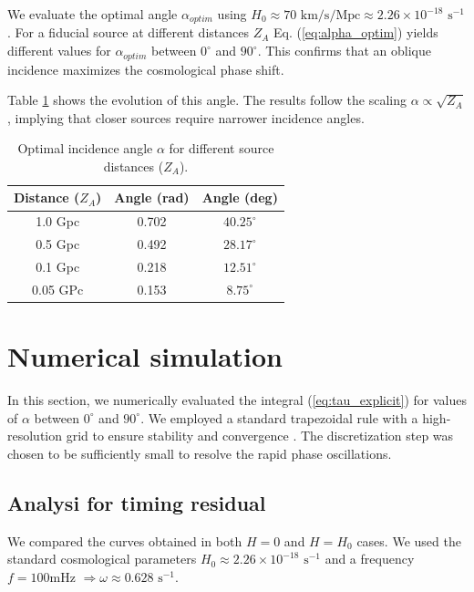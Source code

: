 \documentclass[twocolumn]{revtex4-2}
\begin{document}
We evaluate the optimal angle $\alpha_{optim}$ using $H_0 \approx 70 \text{ km/s/Mpc} \approx 2.26 \times 10^{-18} \text{ s}^{-1}$. For a fiducial source at different distances $Z_A$ Eq. (\ref{eq:alpha_optim}) yields different values for $\alpha_{optim}$ between $0^\circ$ and $90^\circ$. This confirms that an oblique incidence maximizes the cosmological phase shift.

Table \ref{tab:optimal_angles} shows the evolution of this angle. The results follow the scaling $\alpha \propto \sqrt{Z_A}$, implying that closer sources require narrower incidence angles.
\begin{table}[!ht]
\centering
\small 
\begin{tabular}{c c c} 
 \hline \hline
 \textbf{Distance} ($Z_A$) & \textbf{Angle} (rad) & \textbf{Angle} (deg) \\ 
 \hline
 1.0 Gpc & 0.702 & $40.25^\circ$ \\ 
 0.5 Gpc & 0.492 & $28.17^\circ$ \\
 0.1 Gpc & 0.218 & $12.51^\circ$ \\
 0.05 GPc & 0.153 & $8.75^\circ$ \\
 \hline \hline
\end{tabular}
\caption{Optimal incidence angle $\alpha$ for different source distances ($Z_A$).}
\label{tab:optimal_angles}
\end{table}

\vspace{-0.5cm}

\section{Numerical simulation}

In this section, we numerically evaluated the integral (\ref{eq:tau_explicit}) for values of $\alpha$ between $0^\circ$ and $90^\circ$. We employed a standard trapezoidal rule with a high-resolution grid to ensure stability and convergence \cite{NumericalRecipes}. The discretization step was chosen to be sufficiently small to resolve the rapid phase oscillations.
\vspace{-0.2cm}
\subsection{Analysi for timing residual}

We compared the curves obtained in both $H=0$ and $H=H_0$ cases. We used the standard cosmological parameters $H_0 \approx 2.26 \times 10^{-18} \text{ s}^{-1}$ and a frequency $f=100 \text{mHz}$ $\Rightarrow \omega \approx 0.628 \text{ s}^{-1}$.
\end{document}

